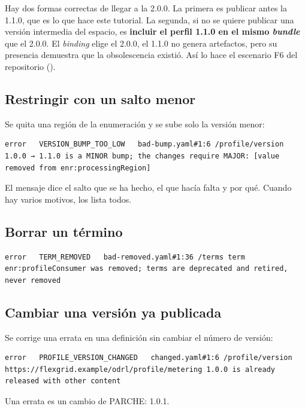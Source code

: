 Hay dos formas correctas de llegar a la 2.0.0. La primera es publicar antes la 1.1.0, que es lo que hace este
tutorial. La segunda, si no se quiere publicar una versión intermedia del espacio, es \textbf{incluir el perfil
1.1.0 en el mismo \emph{bundle}} que el 2.0.0. El \emph{binding} elige el 2.0.0, el 1.1.0 no genera artefactos,
pero su presencia demuestra que la obsolescencia existió. Así lo hace el escenario F6 del repositorio
().

\subsection{Restringir con un salto menor}

Se quita una región de la enumeración y se sube solo la versión menor:

\begin{lstlisting}[style=out]
error   VERSION_BUMP_TOO_LOW   bad-bump.yaml#1:6 /profile/version 1.0.0 → 1.1.0 is a MINOR bump; the changes require MAJOR: [value removed from enr:processingRegion]
\end{lstlisting}

El mensaje dice el salto que se ha hecho, el que hacía falta y por qué. Cuando hay varios motivos, los lista
todos.

\subsection{Borrar un término}

\begin{lstlisting}[style=out]
error   TERM_REMOVED   bad-removed.yaml#1:36 /terms term enr:profileConsumer was removed; terms are deprecated and retired, never removed
\end{lstlisting}

\subsection{Cambiar una versión ya publicada}

Se corrige una errata en una definición sin cambiar el número de versión:

\begin{lstlisting}[style=out]
error   PROFILE_VERSION_CHANGED   changed.yaml#1:6 /profile/version https://flexgrid.example/odrl/profile/metering 1.0.0 is already released with other content
\end{lstlisting}

Una errata es un cambio de PARCHE: 1.0.1.

